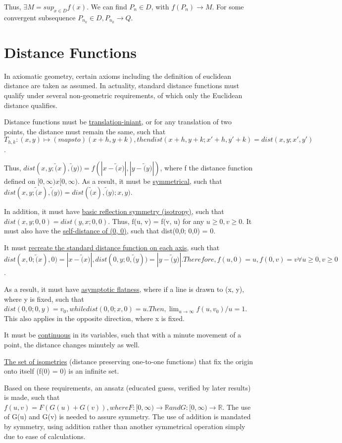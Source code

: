 Thus, $\exists M = sup_{x \in D}f(x)$. We can find $P_n \in D$, with $f(P_n) \to M$. For some convergent subsequence $P_{n_k} \in D, P_{n_k} \to Q$.

\section{Distance Functions}
In axiomatic geometry, certain axioms including the definition of euclidean distance are taken as assumed. In actuality, standard distance functions must qualify under several non-geometric requirements, of which only the Euclidean distance qualifies.

Distance functions must be \underline{translation-iniant}, or for any translation of two points, the distance must remain the same, such that $T_{h, k}: (x, y) \mapsto (maps to) (x+h, y+k), then dist(x+h, y+k; x'+h, y'+k) = dist(x, y; x', y')$. 

Thus, $dist(x,y; \tilde(x), \tilde(y)) = f(|x-\tilde(x)|, |y-\tilde(y)|)$, where f the distance function defined on $[0, \infty) x [0, \infty).$ As a result, it must be \underline{symmetrical}, such that $dist(x, y; \tilde(x), \tilde(y)) = dist(\tilde(x), \tilde(y); x, y)$.

In addition, it must have \underline{basic reflection symmetry (isotropy)}, such that $dist(x, y; 0, 0) = dist(y, x; 0, 0)$. Thus, f(u, v) = f(v, u) for any $u \geq 0, v \geq 0$. It must also have the \underline{self-distance of (0, 0)}, such that dist(0,0; 0,0) = 0.

It must \underline{recreate the standard distance function on each axis}, such that $dist(x,0; \tilde(x), 0) = |x - \tilde(x)|, dist(0, y; 0, \tilde(y)) = |y - \tilde(y)|. Therefore, f(u, 0) = u, f(0, v) = v \forall u \geq 0, v \geq 0$.

As a result, it must have \underline{asymptotic flatness}, where if a line is drawn to (x, y), where y is fixed, such that $dist(0,0; 0, y) = v_0, while dist(0, 0; x, 0) = u. Then, \lim_{u \to \infty} f(u, v_0)/u = 1$. This also applies in the opposite direction, where x is fixed.

It must be \underline{continuous} in its variables, such that with a minute movement of a point, the distance changes minutely as well.

\underline{The set of isometries} (distance preserving one-to-one functions) that fix the origin onto itself (f(0) = 0) is an infinite set.

Based on these requirements, an ansatz (educated guess, verified by later results) is made, such that $f(u, v) = F(G(u) + G(v)), where F: [0, \infty) \to \mathbb{R} and G: [0, \infty) \to \mathbb{R}$. The use of G(u) and G(v) is needed to assure symmetry. The use of addition is mandated by symmetry, using addition rather than another symmetrical operation simply due to ease of calculations.

